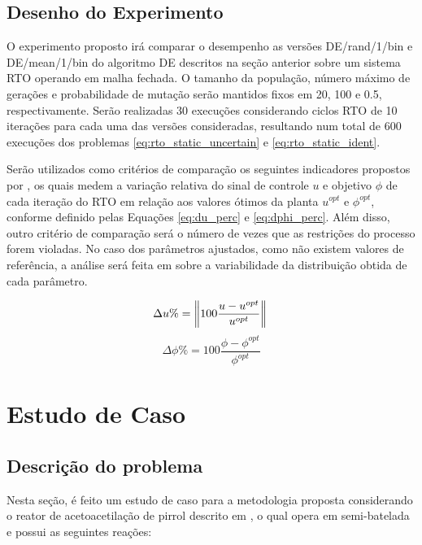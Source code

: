 \documentclass[conference]{IEEEtran}
\begin{document}
\subsection{Desenho do Experimento}
O experimento proposto irá comparar o desempenho as versões DE/rand/1/bin e DE/mean/1/bin do algoritmo DE descritos na seção anterior sobre um sistema RTO operando em malha fechada. O tamanho da população, número máximo de gerações e probabilidade de mutação serão mantidos fixos em 20, 100 e 0.5, respectivamente. Serão realizadas 30 execuções considerando ciclos RTO de 10 iterações para cada uma das versões consideradas, resultando num total de 600 execuções dos problemas \ref{eq:rto_static_uncertain} e \ref{eq:rto_static_ident}.

Serão utilizados como critérios de comparação os seguintes indicadores propostos por \cite{quelhas2013common}, os quais medem a variação relativa do sinal de controle $u$ e objetivo $\phi$ de cada iteração do RTO em relação aos valores ótimos da planta $u^{opt}$ e $\phi^{opt}$, conforme definido pelas Equações \ref{eq:du_perc} e \ref{eq:dphi_perc}. Além disso, outro critério de comparação será o número de vezes que as restrições do processo forem violadas. No caso dos parâmetros ajustados, como não existem valores de referência, a análise será feita em sobre a variabilidade da distribuição obtida de cada parâmetro.

\begin{equation}
	\label{eq:du_perc}
 \Delta u\% =  \left\|100 \frac{u - u^{opt}}{u^{opt}} \right\| \\
\end{equation}
\begin{equation}
	\label{eq:dphi_perc}
	\Delta \phi \% =  100 \frac{\phi - \phi^{opt}}{\phi^{opt}} 
\end{equation}


\section{Estudo de Caso}

\subsection{Descrição do problema}

Nesta seção, é feito um estudo de caso para a metodologia proposta considerando o reator de acetoacetilação de pirrol descrito em \cite{ruppen1998implementation}, o qual opera em semi-batelada e possui as seguintes reações:
\end{document}
